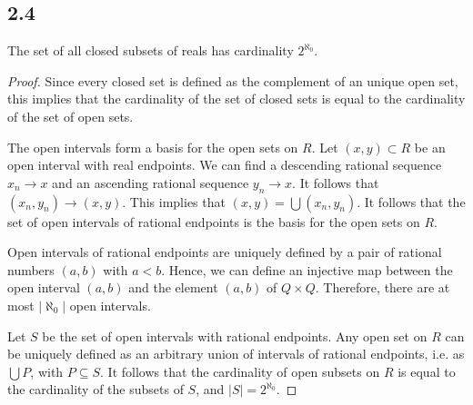 \subsection*{2.4} The set of all closed subsets of reals has cardinality $2^{\aleph_0}$.

\begin{proof}
Since every closed set is defined as the complement of an unique open set, this implies that the cardinality of the set of closed sets is equal to the cardinality of the set of open sets.

The open intervals form a basis for the open sets on $R$. Let $(x,y) \subset R$ be an open interval with real endpoints. We can find a descending rational sequence $x_n \rightarrow x$ and an ascending rational sequence $y_n \rightarrow x$. It follows that $(x_n, y_n) \rightarrow (x,y)$. This implies that $(x,y) = \bigcup (x_n, y_n)$. It follows that the set of open intervals of rational endpoints is the basis for the open sets on $R$.

Open intervals of rational endpoints are uniquely defined by a pair of rational numbers $(a,b)$ with $a<b$. Hence, we can define an injective map between the open interval $(a,b)$ and the element $(a,b)$ of $Q \times Q$. Therefore, there are at most $|\aleph_0|$ open intervals.

Let $S$ be the set of open intervals with rational endpoints. Any open set on $R$ can be uniquely defined as an arbitrary union of intervals of rational endpoints, i.e. as $\bigcup P$, with $P \subseteq S$. It follows that the cardinality of open subsets on $R$ is equal to the cardinality of the subsets of $S$, and $|S| = 2^{\aleph_0}$.
\end{proof}

